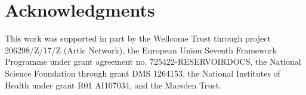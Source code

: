 \documentclass{bioinfo}
\begin{document}




\section*{Acknowledgments}

This work was supported in part by
the Wellcome Trust through project 206298/Z/17/Z (Artic Network),
the European Union Seventh Framework Programme under grant agreement no. 725422-RESERVOIRDOCS,
the National Science Foundation through grant DMS 1264153,
the National Institutes of Health under grant R01 AI107034,
and
the Marsden Trust.



\end{document}
